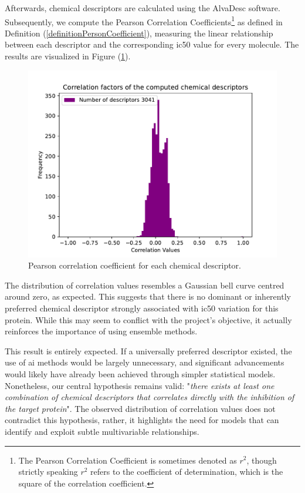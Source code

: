 \documentclass[11pt]{article}
\begin{document}
\hspace{0.55cm}Afterwards, chemical descriptors are calculated using the AlvaDesc software. Subsequently, we compute the Pearson Correlation Coefficients\footnote{The Pearson Correlation Coefficient is sometimes denoted as $r^2$, though strictly speaking $r^2$ refers to the coefficient of determination, which is the square of the correlation coefficient.} as defined in Definition (\ref{definitionPersonCoefficient}), measuring the linear relationship between each descriptor and the corresponding \gls{ic50} value for every molecule. The results are visualized in Figure (\ref{figureGraphicCorrelationFactor}).

\begin{figure}[H]
	\centering
	\includegraphics[width = \textwidth, trim={0.6cm 0.3cm 1.5cm 1.35cm}, clip]{../Plots/ChEMBL_ExtractorData_CHEMBL230_IC50_1000CorrelationFactors.pdf}
	\caption{Pearson correlation coefficient for each chemical descriptor.}
	\label{figureGraphicCorrelationFactor}
\end{figure}

The distribution of correlation values resembles a Gaussian bell curve centred around zero, as expected. This suggests that there is no dominant or inherently preferred chemical descriptor strongly associated with \gls{ic50} variation for this protein. While this may seem to conflict with the project's objective, it actually reinforces the importance of using ensemble methods.

This result is entirely expected. If a universally preferred descriptor existed, the use of \gls{ai} methods would be largely unnecessary, and significant advancements would likely have already been achieved through simpler statistical models. Nonetheless, our central hypothesis remains valid: "\emph{there exists at least one combination of chemical descriptors that correlates directly with the inhibition of the target protein}". The observed distribution of correlation values does not contradict this hypothesis, rather, it highlights the need for models that can identify and exploit subtle multivariable relationships.
\end{document}
